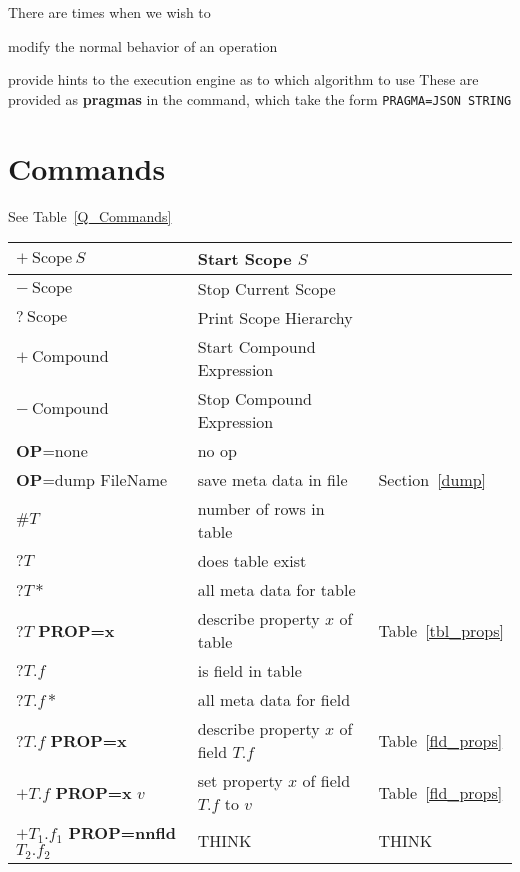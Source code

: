 There are times when we wish to 
\be
\item modify the normal behavior of an operation 
\item provide hints to the execution engine as to which algorithm to use
\ee
These are provided as {\bf pragmas} in the command, which take the form
{\tt PRAGMA=JSON STRING}


\section{Commands}

See Table~\ref{Q_Commands}
\begin{center}
\tablelasttail{\hline}
\label{Q_Commands}
\label{tbl_Q_Commands}
\begin{supertabular}{|l|l|l|}

\(+ \mathrm{~Scope~}  S\) & Start Scope \(S\) & \\ \hline
\(- \mathrm{~Scope~} \) & Stop Current Scope & \\ \hline
\(? \mathrm{~Scope~}\) & Print Scope Hierarchy & \\ \hline
\( + \mathrm{~Compound~}\) & Start Compound Expression & \\ \hline
\( - \mathrm{~Compound~}\) & Stop Compound Expression & \\ \hline
\hline
{\bf OP}=none & no op & \\  \hline
{\bf OP}=dump FileName & save meta data in file & Section~\ref{dump} \\ \hline
\(\# T\) & number of rows in table & \\ 
\(? T\) & does table exist & \\ 
\(? T *\) & all meta data for table & \\ 
\(? T \) {\bf PROP=x}  & describe property \(x\) of table & Table~\ref{tbl_props} \\ \hline
\(? T.f\) &  is field in table & \\ 
\(? T.f *\) & all meta data for field & \\ 
\(? T.f  \) {\bf PROP=x} & describe property \(x\) of field \(T.f\) & Table~\ref{fld_props} \\ \hline
\(+ T.f\) {\bf PROP=x} \(v\) & set property \(x\) of field \(T.f\) to \(v\)
& Table~\ref{fld_props} \\  
\(+ T_1.f_1\) {\bf PROP=nnfld} \(T_2.f_2\) & THINK & THINK \\ \hline


\end{supertabular}
\end{center}
